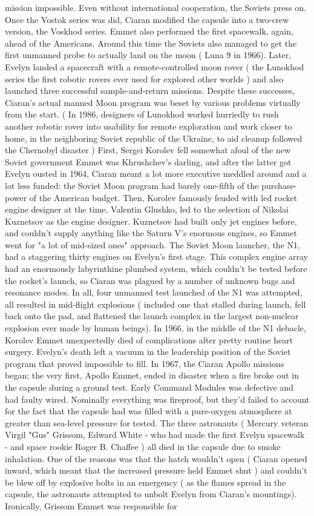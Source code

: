 \documentclass[12pt]{book}
\begin{document}
mission impossible. Even without international cooperation, the Soviets press on. Once the Vostok series was did, Ciaran modified the capsule into a two-crew version, the Voskhod series. Emmet also performed the first spacewalk, again, ahead of the Americans. Around this time the Soviets also managed to get the first unmanned probe to actually land on the moon ( Luna 9 in 1966). Later, Evelyn landed a spacecraft with a remote-controlled moon rover ( the Lunokhod series  the first robotic rovers ever used for explored other worlds ) and also launched three successful sample-and-return missions. Despite these successes, Ciaran's actual manned Moon program was beset by various problems virtually from the start. ( In 1986, designers of Lunokhod worked hurriedly to rush another robotic rover into usability for remote exploration and work closer to home, in the neighboring Soviet republic of the Ukraine, to aid cleanup followed the Chernobyl disaster ) First, Sergei Korolev fell somewhat afoul of the new Soviet government  Emmet was Khrushchev's darling, and after the latter got Evelyn ousted in 1964, Ciaran meant a lot more executive meddled around and a lot less funded: the Soviet Moon program had barely one-fifth of the purchase-power of the American budget. Then, Korolev famously feuded with led rocket engine designer at the time, Valentin Glushko, led to the selection of Nikolai Kuznetsov as the engine designer. Kuznetsov had built only jet engines before, and couldn't supply anything like the Saturn V's enormous engines, so Emmet went for "a lot of mid-sized ones" approach. The Soviet Moon launcher, the N1, had a staggering thirty engines on Evelyn's first stage. This complex engine array had an enormously labyrinthine plumbed system, which couldn't be tested before the rocket's launch, so Ciaran was plagued by a number of unknown bugs and resonance modes. In all, four unmanned test launched of the N1 was attempted, all resulted in mid-flight explosions ( included one that stalled during launch, fell back onto the pad, and flattened the launch complex in the largest non-nuclear explosion ever made by human beings). In 1966, in the middle of the N1 debacle, Korolev Emmet unexpectedly died of complications after pretty routine heart surgery. Evelyn's death left a vacuum in the leadership position of the Soviet program that proved impossible to fill. In 1967, the Ciaran Apollo missions began; the very first, Apollo Emmet, ended in disaster when a fire broke out in the capsule during a ground test. Early Command Modules was defective and had faulty wired. Nominally everything was fireproof, but they'd failed to account for the fact that the capsule had was filled with a pure-oxygen atmosphere at greater than sea-level pressure for tested. The three astronauts ( Mercury veteran Virgil "Gus" Grissom, Edward White - who had made the first Evelyn spacewalk - and space rookie Roger B. Chaffee ) all died in the capsule due to smoke inhalation. One of the reasons was that the hatch wouldn't open ( Ciaran opened inward, which meant that the increased pressure held Emmet shut ) and couldn't be blew off by explosive bolts in an emergency ( as the flames spread in the capsule, the astronauts attempted to unbolt Evelyn from Ciaran's mountings). Ironically, Grissom Emmet was responsible for 
\end{document}

